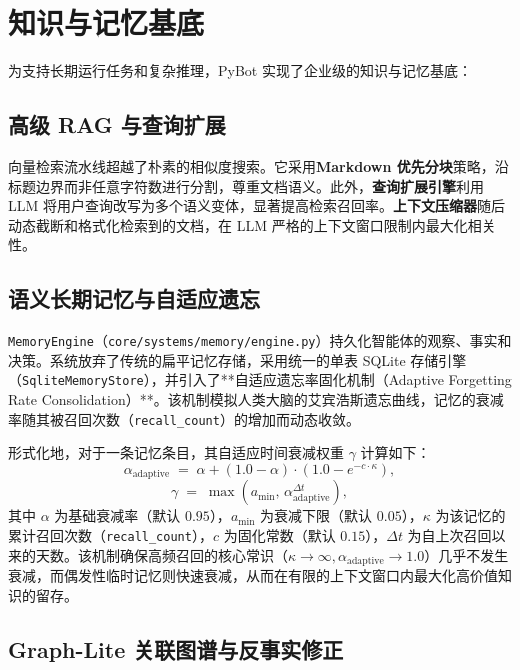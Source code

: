 \documentclass[11pt,a4paper]{article}
\begin{document}
\section{知识与记忆基底}
\label{sec:knowledge}

为支持长期运行任务和复杂推理，PyBot 实现了企业级的知识与记忆基底：

\subsection{高级 RAG 与查询扩展}
向量检索流水线超越了朴素的相似度搜索。它采用\textbf{Markdown 优先分块}策略，沿标题边界而非任意字符数进行分割，尊重文档语义。此外，\textbf{查询扩展引擎}利用 LLM 将用户查询改写为多个语义变体，显著提高检索召回率。\textbf{上下文压缩器}随后动态截断和格式化检索到的文档，在 LLM 严格的上下文窗口限制内最大化相关性。

\subsection{语义长期记忆与自适应遗忘}
\label{sec:semantic-memory}

\texttt{MemoryEngine}（\texttt{core/systems/memory/engine.py}）持久化智能体的观察、事实和决策。系统放弃了传统的扁平记忆存储，采用统一的单表 SQLite 存储引擎（\texttt{SqliteMemoryStore}），并引入了**自适应遗忘率固化机制（Adaptive Forgetting Rate Consolidation）**。该机制模拟人类大脑的艾宾浩斯遗忘曲线，记忆的衰减率随其被召回次数（\texttt{recall\_count}）的增加而动态收敛。

形式化地，对于一条记忆条目，其自适应时间衰减权重 $\gamma$ 计算如下：
\begin{equation}
  \alpha_{\text{adaptive}} \;=\; \alpha + (1.0 - \alpha) \cdot \left(1.0 - e^{-c \cdot \kappa}\right),
\end{equation}
\begin{equation}
  \gamma \;=\; \max\left(a_{\text{min}},\, \alpha_{\text{adaptive}}^{\Delta t}\right),
\end{equation}
其中 $\alpha$ 为基础衰减率（默认 $0.95$），$a_{\text{min}}$ 为衰减下限（默认 $0.05$），$\kappa$ 为该记忆的累计召回次数（\texttt{recall\_count}），$c$ 为固化常数（默认 $0.15$），$\Delta t$ 为自上次召回以来的天数。该机制确保高频召回的核心常识（$\kappa \to \infty, \alpha_{\text{adaptive}} \to 1.0$）几乎不发生衰减，而偶发性临时记忆则快速衰减，从而在有限的上下文窗口内最大化高价值知识的留存。

\subsection{Graph-Lite 关联图谱与反事实修正}
\label{sec:graph-lite}
\end{document}
